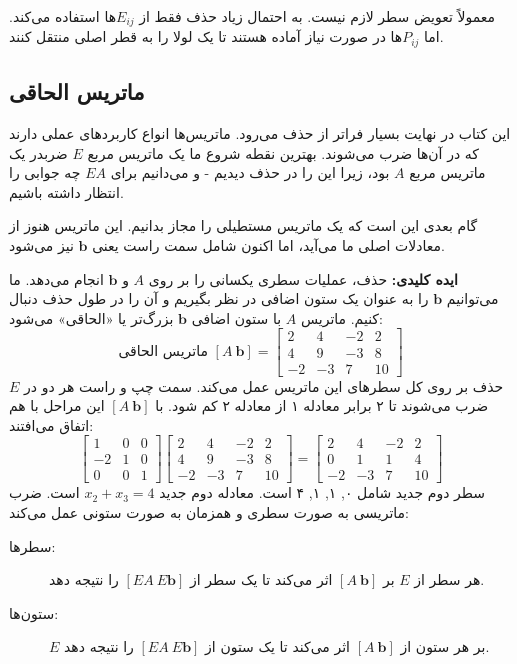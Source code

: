 \documentclass[12pt, a4paper]{book}
\begin{document}
	معمولاً تعویض سطر لازم نیست. به احتمال زیاد حذف فقط از $E_{ij}$ها استفاده می‌کند. اما $P_{ij}$ها در صورت نیاز آماده هستند تا یک لولا را به قطر اصلی منتقل کنند.
	
	\subsection*{ماتریس الحاقی}
	این کتاب در نهایت بسیار فراتر از حذف می‌رود. ماتریس‌ها انواع کاربردهای عملی دارند که در آن‌ها ضرب می‌شوند. بهترین نقطه شروع ما یک ماتریس مربع $E$ ضربدر یک ماتریس مربع $A$ بود، زیرا این را در حذف دیدیم - و می‌دانیم برای $EA$ چه جوابی را انتظار داشته باشیم.
	
	گام بعدی این است که یک ماتریس مستطیلی را مجاز بدانیم. این ماتریس هنوز از معادلات اصلی ما می‌آید، اما اکنون شامل سمت راست یعنی $\mathbf{b}$ نیز می‌شود.
	
	\textbf{ایده کلیدی:} حذف، عملیات سطری یکسانی را بر روی $A$ و $\mathbf{b}$ انجام می‌دهد. ما می‌توانیم $\mathbf{b}$ را به عنوان یک ستون اضافی در نظر بگیریم و آن را در طول حذف دنبال کنیم. ماتریس $A$ با ستون اضافی $\mathbf{b}$ بزرگ‌تر یا «الحاقی» می‌شود:
	\[
	\text{ماتریس الحاقی } [A \ \mathbf{b}] = \left[ \begin{array}{ccc|c} 2 & 4 & -2 & 2 \\ 4 & 9 & -3 & 8 \\ -2 & -3 & 7 & 10 \end{array} \right]
	\]
	حذف بر روی کل سطرهای این ماتریس عمل می‌کند. سمت چپ و راست هر دو در $E$ ضرب می‌شوند تا ۲ برابر معادله ۱ از معادله ۲ کم شود. با $[A \ \mathbf{b}]$ این مراحل با هم اتفاق می‌افتند:
	\[
	\begin{bmatrix} 1 & 0 & 0 \\ -2 & 1 & 0 \\ 0 & 0 & 1 \end{bmatrix}
	\left[ \begin{array}{ccc|c} 2 & 4 & -2 & 2 \\ 4 & 9 & -3 & 8 \\ -2 & -3 & 7 & 10 \end{array} \right]
	=
	\left[ \begin{array}{ccc|c} 2 & 4 & -2 & 2 \\ 0 & 1 & 1 & 4 \\ -2 & -3 & 7 & 10 \end{array} \right]
	\]
	سطر دوم جدید شامل ۰, ۱, ۱, ۴ است. معادله دوم جدید $x_2 + x_3 = 4$ است. ضرب ماتریسی به صورت سطری و همزمان به صورت ستونی عمل می‌کند:
	
	\begin{description}
		\item[سطرها:] هر سطر از $E$ بر $[A \ \mathbf{b}]$ اثر می‌کند تا یک سطر از $[EA \ E\mathbf{b}]$ را نتیجه دهد.
		\item[ستون‌ها:] $E$ بر هر ستون از $[A \ \mathbf{b}]$ اثر می‌کند تا یک ستون از $[EA \ E\mathbf{b}]$ را نتیجه دهد.
	\end{description}
	
\end{document}
